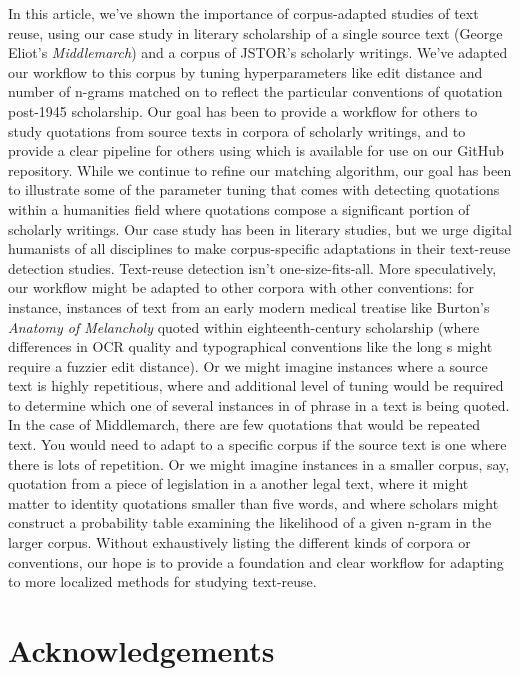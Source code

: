 \documentclass[
]{article}
\begin{document}
In this article, we've shown the importance of corpus-adapted studies of
text reuse, using our case study in literary scholarship of a single
source text (George Eliot's \emph{Middlemarch}) and a corpus of JSTOR's
scholarly writings. We've adapted our workflow to this corpus by tuning
hyperparameters like edit distance and number of n-grams matched on to
reflect the particular conventions of quotation post-1945 scholarship.
Our goal has been to provide a workflow for others to study quotations
from source texts in corpora of scholarly writings, and to provide a
clear pipeline for others using which is available for use on our GitHub
repository. While we continue to refine our matching algorithm, our goal
has been to illustrate some of the parameter tuning that comes with
detecting quotations within a humanities field where quotations compose
a significant portion of scholarly writings. Our case study has been in
literary studies, but we urge digital humanists of all disciplines to
make corpus-specific adaptations in their text-reuse detection studies.
Text-reuse detection isn't one-size-fits-all. More speculatively, our
workflow might be adapted to other corpora with other conventions: for
instance, instances of text from an early modern medical treatise like
Burton's \emph{Anatomy of Melancholy} quoted within eighteenth-century
scholarship (where differences in OCR quality and typographical
conventions like the long s might require a fuzzier edit distance). Or
we might imagine instances where a source text is highly repetitious,
where and additional level of tuning would be required to determine
which one of several instances in of phrase in a text is being quoted.
In the case of Middlemarch, there are few quotations that would be
repeated text. You would need to adapt to a specific corpus if the
source text is one where there is lots of repetition. Or we might
imagine instances in a smaller corpus, say, quotation from a piece of
legislation in a another legal text, where it might matter to identity
quotations smaller than five words, and where scholars might construct a
probability table examining the likelihood of a given n-gram in the
larger corpus. Without exhaustively listing the different kinds of
corpora or conventions, our hope is to provide a foundation and clear
workflow for adapting to more localized methods for studying text-reuse.

\hypertarget{acknowledgements}{%
\section{Acknowledgements}\label{acknowledgements}}
\end{document}
